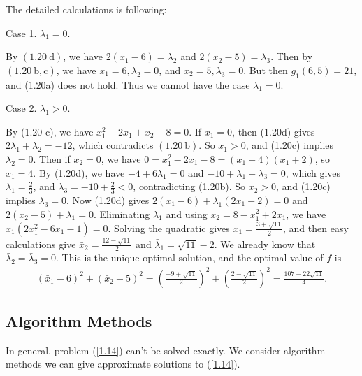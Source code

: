 The detailed calculations is following:

Case 1. $\lambda_{1}=0$.

By $(1.20 \mathrm{~d})$, we have $2\left(x_{1}-6\right)=\lambda_{2}$ and $2\left(x_{2}-5\right)=\lambda_{3}$. Then by $(1.20 \mathrm{~b}, \mathrm{c})$, we have $x_{1}=6, \lambda_{2}=0$, and $x_{2}=5, \lambda_{3}=0$. But then $g_{1}(6,5)=21$, and (1.20a) does not hold. Thus we cannot have the case $\lambda_{1}=0$.

Case 2. $\lambda_{1}>0$.

By (1.20 c), we have $x_{1}^{2}-2 x_{1}+x_{2}-8=0$. If $x_{1}=0$, then (1.20d) gives $2 \lambda_{1}+\lambda_{2}=-12$, which contradicts $(1.20 \mathrm{~b})$. So $x_{1}>0$, and (1.20c) implies $\lambda_{2}=0$. Then if $x_{2}=0$, we have $0=x_{1}^{2}-2 x_{1}-8=\left(x_{1}-4\right)\left(x_{1}+2\right)$, so $x_{1}=4$. By (1.20d), we have $-4+6 \lambda_{1}=0$ and $-10+\lambda_{1}-\lambda_{3}=0$, which gives $\lambda_{1}=\frac{2}{3}$, and $\lambda_{3}=-10+\frac{2}{3}<0$, contradicting (1.20b). So $x_{2}>0$, and (1.20c) implies $\lambda_{3}=0$. Now (1.20d) gives $2\left(x_{1}-6\right)+\lambda_{1}\left(2 x_{1}-2\right)=0$ and $2\left(x_{2}-5\right)+\lambda_{1}=0$. Eliminating $\lambda_{1}$ and using $x_{2}=8-x_{1}^{2}+2 x_{1}$, we have $x_{1}\left(2 x_{1}^{2}-6 x_{1}-1\right)=0$. Solving the quadratic gives $\bar{x}_{1}=\frac{3+\sqrt{11}}{2}$, and then easy calculations give $\bar{x}_{2}=\frac{12-\sqrt{11}}{2}$ and $\bar{\lambda}_{1}=\sqrt{11}-2$. We already know that $\bar{\lambda}_{2}=\bar{\lambda}_{3}=0$. This is the unique optimal solution, and the optimal value of $f$ is
\begin{align*}
    \left( \bar{x}_{1}-6\right)^{2} + \left(\bar{x}_{2}-5\right)^{2} = \left(\frac{-9+\sqrt{11}}{2}\right)^{2}+\left(\frac{2-\sqrt{11}}{2}\right)^{2}=\frac{107-22 \sqrt{11}}{4} .
\end{align*}

\subsection{Algorithm Methods}
In general, problem (\ref{1.14}) can't be solved exactly. We consider algorithm methods we can give approximate solutions to (\ref{1.14}).

